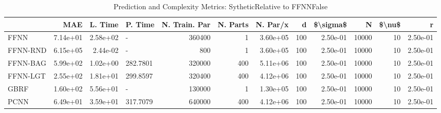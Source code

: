 \begin{table}
\centering
\caption{Prediction and Complexity Metrics: SytheticRelative to FFNNFalse}
\label{tab__Sythetic__Fix_Neurons_QTrue}
\begin{tabular}{lrrlrrrrrrrr}
\toprule
{} &      MAE &  L. Time &   P. Time &  N. Train. Par &  N. Parts &  N. Par/x &    d &  \$\textbackslash sigma\$ &      N &  \$\textbackslash nu\$ &        r \\
\midrule
FFNN     & 7.14e+01 & 2.58e+02 &         - &         360400 &         1 &  3.60e+05 &  100 &  2.50e-01 &  10000 &     10 & 2.50e-01 \\
FFNN-RND & 6.15e+05 & 2.44e-02 &         - &            800 &         1 &  3.60e+05 &  100 &  2.50e-01 &  10000 &     10 & 2.50e-01 \\
FFNN-BAG & 5.99e+02 & 1.02e+00 &  282.7801 &         320000 &       400 &  5.11e+06 &  100 &  2.50e-01 &  10000 &     10 & 2.50e-01 \\
FFNN-LGT & 2.55e+02 & 1.81e+01 &  299.8597 &         320400 &       400 &  4.12e+06 &  100 &  2.50e-01 &  10000 &     10 & 2.50e-01 \\
GBRF     & 1.60e+02 & 5.56e+01 &         - &         130000 &         1 &  1.30e+05 &  100 &  2.50e-01 &  10000 &     10 & 2.50e-01 \\
PCNN     & 6.49e+01 & 3.59e+01 &  317.7079 &         640000 &       400 &  4.12e+06 &  100 &  2.50e-01 &  10000 &     10 & 2.50e-01 \\
\bottomrule
\end{tabular}
\end{table}
